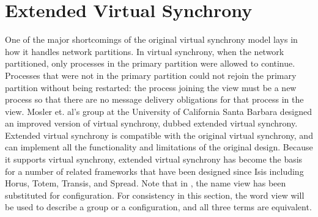 \section{Extended Virtual Synchrony}
One of the major shortcomings of the original virtual synchrony model lays in how it handles network partitions. In virtual synchrony, when the network partitioned, only processes in the primary partition were allowed to continue. Processes that were not in the primary partition could not rejoin the primary partition without being restarted: the process joining the view must be a new process so that there are no message delivery obligations for that process in the view.
Mosler et. al's group at the University of California Santa Barbara\cite{EXTENDEDVIRTUALSYNCHRONY} designed an improved version of virtual synchrony, dubbed extended virtual synchrony. Extended virtual synchrony is compatible with the original virtual synchrony, and can implement all the functionality and limitations of the original design. Because it supports virtual synchrony, extended virtual synchrony has become the basis for a number of related frameworks that have been designed since Isis including Horus, Totem, Transis, and Spread.
Note that in \cite{EXTENDEDVIRTUALSYNCHRONY}, the name view has been substituted for configuration. For consistency in this section, the word view will be used to describe a group or a configuration, and all three terms are equivalent.

